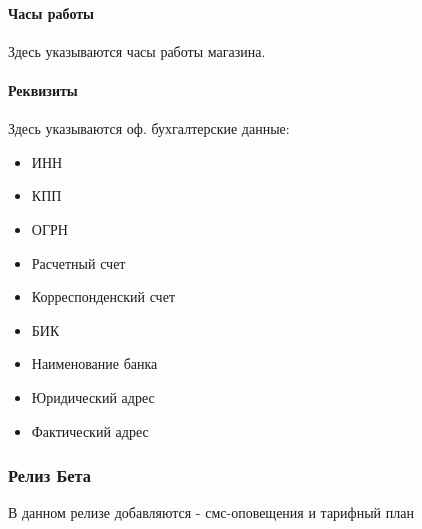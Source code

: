 \documentclass[DIV=calc, paper=a4, fontsize=11pt]{scrartcl} %
\begin{document}
\paragraph{Часы работы}
Здесь указываются часы работы магазина.

\paragraph{Реквизиты}
Здесь указываются оф. бухгалтерские данные:

\begin{itemize}
	\item ИНН
	\item КПП
	\item ОГРН
	\item Расчетный счет
	\item Корреспонденский счет
	\item БИК
	\item Наименование банка
	\item Юридический адрес
	\item Фактический адрес
\end{itemize}

\subsubsection{Релиз Бета}

В данном релизе добавляются - смс-оповещения и тарифный план 
\end{document}
